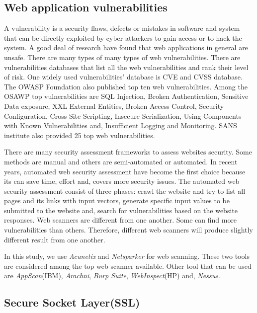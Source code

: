 \documentclass[conference]{IEEEtran}
\begin{document}
\subsection{Web application vulnerabilities}

A vulnerability is a security flaws, defects or mistakes in software
and system that can be directly exploited by cyber attackers to gain
access or to hack the
system\cite{awang2014survey}\cite{srinivasan2017web}. A good deal of
research have found that web applications in general are
unsafe\cite{alsmadi2016government}\cite{antunes2014penetration}. There
are many types of many types of web vulnerabilities. There are
vulnerabilities databases that list all the web vulnerabilities and
rank their level of risk. One widely used vulnerabilities' database is
CVE and CVSS database\cite{mell2006common}. The OWASP Foundation also
published top ten web vulnerabilities\cite{bertino2017botnets}. Among
the OSAWP top vulnerabilities are SQL Injection, Broken
Authentication, Sensitive Data exposure, XXL External Entities, Broken
Access Control, Security Configuration, Cross-Site Scripting,
Insecure Serialization, Using Components with Known Vulnerabilities
and, Insufficient Logging and
Monitoring\cite{owasp10application}. SANS institute also provided 25
top web vulnerabilities\cite{scholte2012have}.

There are many security assessment frameworks to assess websites
security. Some methods are manual and others are semi-automated or
automated. In recent years, automated web security assessment have
become the first choice because its can save time, effort and, covers
more security issues. The automated web security assessment consist of
three phases: crawl the website and try to list all pages and its
links with input vectors, generate specific input values to be
submitted to the website and, search for vulnerabilities based on the
website responses\cite{munoz2013methods}.  Web scanners are different
from one another. Some can find more vulnerabilities than
others. Therefore, different web scanners will produce slightly
different result from one another.

In this study, we use \emph{Acunetix} and \emph{Netsparker} for web
scanning. These two tools are considered among the top web scanner
available. Other tool that can be used are \emph{AppScan}(IBM),
\emph{Arachni}, \emph{Burp Suite}, \emph{WebInspect}(HP) and,
\emph{Nessus}\cite{makino2015evaluation}\cite{roldan2017comparison}.

\subsection{Secure Socket Layer(SSL)}
\end{document}

